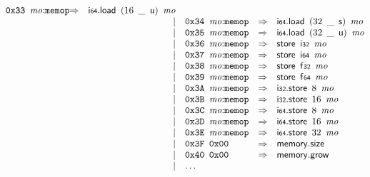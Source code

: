 $$\begin{array}{@{}l@{}rrlll@{}l@{}}
\mathtt{0x33}~\,{\mathit{mo}}{:}{\mathtt{memop}} &\Rightarrow& \mathsf{i{\scriptstyle64}}.\mathsf{load}~\,(16~\,\mathsf{\_}~\,\mathsf{u})~\,{\mathit{mo}} \\ &&|&
\mathtt{0x34}~\,{\mathit{mo}}{:}{\mathtt{memop}} &\Rightarrow& \mathsf{i{\scriptstyle64}}.\mathsf{load}~\,(32~\,\mathsf{\_}~\,\mathsf{s})~\,{\mathit{mo}} \\ &&|&
\mathtt{0x35}~\,{\mathit{mo}}{:}{\mathtt{memop}} &\Rightarrow& \mathsf{i{\scriptstyle64}}.\mathsf{load}~\,(32~\,\mathsf{\_}~\,\mathsf{u})~\,{\mathit{mo}} \\ &&|&
\mathtt{0x36}~\,{\mathit{mo}}{:}{\mathtt{memop}} &\Rightarrow& \mathsf{store}~\,\mathsf{i{\scriptstyle32}}~\,{\mathit{mo}} \\ &&|&
\mathtt{0x37}~\,{\mathit{mo}}{:}{\mathtt{memop}} &\Rightarrow& \mathsf{store}~\,\mathsf{i{\scriptstyle64}}~\,{\mathit{mo}} \\ &&|&
\mathtt{0x38}~\,{\mathit{mo}}{:}{\mathtt{memop}} &\Rightarrow& \mathsf{store}~\,\mathsf{f{\scriptstyle32}}~\,{\mathit{mo}} \\ &&|&
\mathtt{0x39}~\,{\mathit{mo}}{:}{\mathtt{memop}} &\Rightarrow& \mathsf{store}~\,\mathsf{f{\scriptstyle64}}~\,{\mathit{mo}} \\ &&|&
\mathtt{0x3A}~\,{\mathit{mo}}{:}{\mathtt{memop}} &\Rightarrow& \mathsf{i{\scriptstyle32}}.\mathsf{store}~\,8~\,{\mathit{mo}} \\ &&|&
\mathtt{0x3B}~\,{\mathit{mo}}{:}{\mathtt{memop}} &\Rightarrow& \mathsf{i{\scriptstyle32}}.\mathsf{store}~\,16~\,{\mathit{mo}} \\ &&|&
\mathtt{0x3C}~\,{\mathit{mo}}{:}{\mathtt{memop}} &\Rightarrow& \mathsf{i{\scriptstyle64}}.\mathsf{store}~\,8~\,{\mathit{mo}} \\ &&|&
\mathtt{0x3D}~\,{\mathit{mo}}{:}{\mathtt{memop}} &\Rightarrow& \mathsf{i{\scriptstyle64}}.\mathsf{store}~\,16~\,{\mathit{mo}} \\ &&|&
\mathtt{0x3E}~\,{\mathit{mo}}{:}{\mathtt{memop}} &\Rightarrow& \mathsf{i{\scriptstyle64}}.\mathsf{store}~\,32~\,{\mathit{mo}} \\ &&|&
\mathtt{0x3F}~\,\mathtt{0x00} &\Rightarrow& \mathsf{memory.size} \\ &&|&
\mathtt{0x40}~\,\mathtt{0x00} &\Rightarrow& \mathsf{memory.grow} \\ &&|&
\dots \\
\end{array}
$$

\vspace{1ex}

